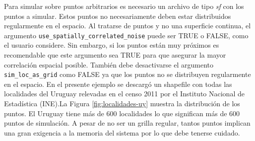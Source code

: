 \documentclass[
  12pt]{article}
\begin{document}
Para simular sobre puntos arbitrarios es necesario un archivo de tipo \emph{sf} con los puntos a simular. Estos puntos no necesariamente deben estar distribuidos regularmente en el espacio. Al tratarse de puntos y no una superficie continua, el argumento \texttt{use\_spatially\_correlated\_noise} puede ser TRUE o FALSE, como el usuario considere. Sin embargo, si los puntos están muy próximos es recomendable que este argumento sea TRUE para que asegurar la mayor correlación espacial posible. También debe desactivarse el argumento \texttt{sim\_loc\_as\_grid} como FALSE ya que los puntos no se distribuyen regularmente en el espacio. En el presente ejemplo se descargó un shapefile con todas las localidades del Uruguay relevadas en el censo 2011 por el Instituto Nacional de Estadística (INE).La Figura \ref{fig:localidades-uy} muestra la distribución de los puntos. El Uruguay tiene más de 600 localidades lo que significan más de 600 puntos de simulación. A pesar de no ser un grilla regular, tantos puntos implican una gran exigencia a la memoria del sistema por lo que debe tenerse cuidado.
\end{document}
